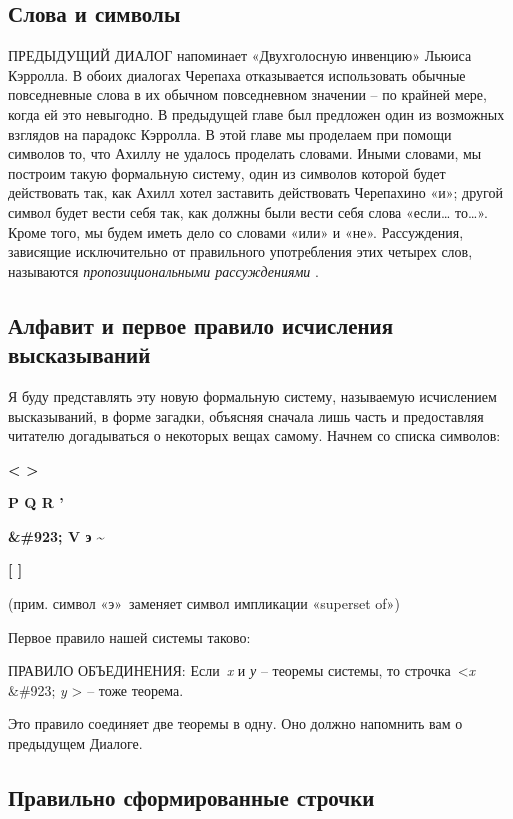 \documentclass[../main.tex]{subfiles}
\begin{document}

\subsection{Слова и символы}

ПРЕДЫДУЩИЙ ДИАЛОГ напоминает «Двухголосную инвенцию» Льюиса Кэрролла. В обоих диалогах Черепаха отказывается использовать обычные повседневные слова в их обычном повседневном значении \--- по крайней мере, когда ей это невыгодно. В предыдущей главе был предложен один из возможных взглядов на парадокс Кэрролла. В этой главе мы проделаем при помощи символов то, что Ахиллу не удалось проделать словами. Иными словами, мы построим такую формальную систему, один из символов которой будет действовать так, как Ахилл хотел заставить действовать Черепахино «и»; другой символ будет вести себя так, как должны были вести себя слова «если\ldots{} то\ldots». Кроме того, мы будем иметь дело со словами «или» и «не». Рассуждения, зависящие исключительно от правильного употребления этих четырех слов, называются \emph{пропозициональными рассуждениями} .


\subsection{Алфавит и первое правило исчисления высказываний}

Я буду представлять эту новую формальную систему, называемую исчислением высказываний, в форме загадки, объясняя сначала лишь часть и предоставляя читателю догадываться о некоторых вещах самому. Начнем со списка символов:

\textbf{\textless{} \textgreater{}}

\textbf{P Q R '}

\textbf{\&\#923; V э \textasciitilde{}}

\textbf{{[} {]}}

(прим. символ «э»~заменяет символ импликации «superset of»)

Первое правило нашей системы таково:

ПРАВИЛО ОБЪЕДИНЕНИЯ: Если~\emph{x} и \emph{у} \--- теоремы системы, то строчка~\textless{}\emph{x} \&\#923; \emph{y} \textgreater{} \--- тоже теорема.

Это правило соединяет две теоремы в одну. Оно должно напомнить вам о предыдущем Диалоге.


\subsection{Правильно сформированные строчки}
\end{document}
